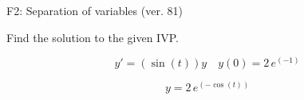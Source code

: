 \begin{exercise}
  \begin{exerciseTitle}F2: Separation of variables (ver. 81)\end{exerciseTitle}
  \begin{exerciseStatement}
    
Find the solution to the given IVP.

    
\[y'=( \sin\left(t\right) )y\hspace{1em} y(0)= 2 \, e^{\left(-1\right)}\]

  \end{exerciseStatement}
  \begin{exerciseAnswer}
    
\[y= 2 \, e^{\left(-\cos\left(t\right)\right)}\]

  \end{exerciseAnswer}
\end{exercise}
